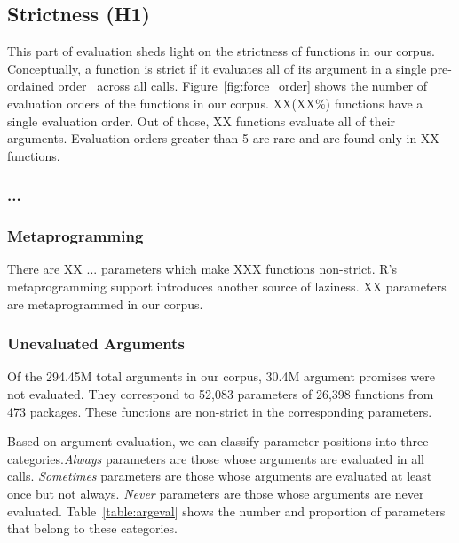 \documentclass[review,nonacm,screen,acmsmall,anonymous=true]{acmart}
\newcommand{\always}{\emph{Always}\xspace}
\newcommand{\sometimes}{\emph{Sometimes}\xspace}
\newcommand{\never}{\emph{Never}\xspace}
\begin{document}
%

\subsection{Strictness (H1)}

This part of evaluation sheds light on the strictness of functions in our
corpus. Conceptually, a function is strict if it evaluates all of its argument
in a single pre-ordained order~\cite{oopsla19b} across all calls.
Figure~\ref{fig:force_order} shows the number of evaluation orders of the
functions in our corpus. XX(XX\%) functions have a single evaluation order. Out
of those, XX functions evaluate all of their arguments. Evaluation orders
greater than 5 are rare and are found only in XX functions.


\subsubsection{...}

\subsubsection{Metaprogramming}
There are XX $...$ parameters which make XXX functions non-strict. R's
metaprogramming support introduces another source of laziness. XX parameters are
metaprogrammed in our corpus.

\subsubsection{Unevaluated Arguments}
Of the 294.45M total arguments in our corpus, 30.4M argument promises were not
evaluated. They correspond to 52,083 parameters of 26,398 functions from 473
packages. These functions are non-strict in the corresponding parameters.

Based on argument evaluation, we can classify parameter positions into three
categories.\always parameters are those whose arguments are evaluated in all
calls. \sometimes parameters are those whose arguments are evaluated at least
once but not always. \never parameters are those whose arguments are never
evaluated. Table~\ref{table:argeval} shows the number and proportion of
parameters that belong to these categories.
\end{document}
